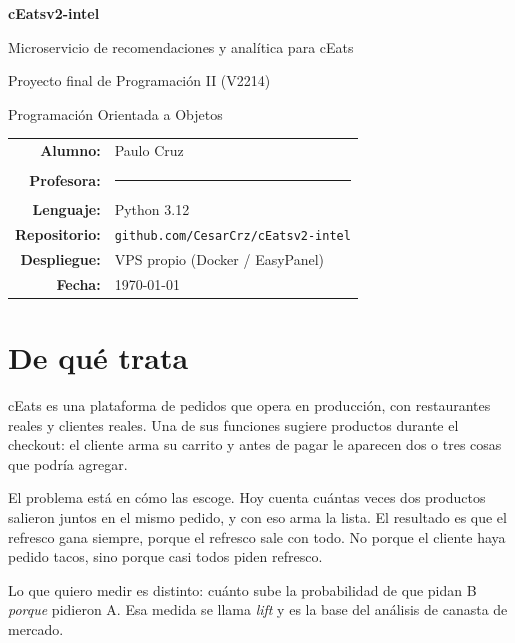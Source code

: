\documentclass[11pt,letterpaper]{article}
\begin{document}
\begin{titlepage}
\centering
\vspace*{2cm}
{\Huge\bfseries cEatsv2-intel\par}
\vspace{0.6cm}
{\Large Microservicio de recomendaciones y analítica para cEats\par}
\vspace{1.5cm}
{\large Proyecto final de Programación II (V2214)\par}
{\large Programación Orientada a Objetos\par}
\vspace{1.5cm}
\begin{tabular}{rl}
\textbf{Alumno:} & Paulo Cruz \\
\textbf{Profesora:} & \rule{5cm}{0.4pt} \\
\textbf{Lenguaje:} & Python 3.12 \\
\textbf{Repositorio:} & \texttt{github.com/CesarCrz/cEatsv2-intel} \\
\textbf{Despliegue:} & VPS propio (Docker / EasyPanel) \\
\textbf{Fecha:} & \today \\
\end{tabular}
\vfill
\end{titlepage}

\tableofcontents
\newpage

\section{De qué trata}

cEats es una plataforma de pedidos que opera en producción, con restaurantes
reales y clientes reales. Una de sus funciones sugiere productos durante el
checkout: el cliente arma su carrito y antes de pagar le aparecen dos o tres
cosas que podría agregar.

El problema está en cómo las escoge. Hoy cuenta cuántas veces dos productos
salieron juntos en el mismo pedido, y con eso arma la lista. El resultado es que
el refresco gana siempre, porque el refresco sale con todo. No porque el cliente
haya pedido tacos, sino porque casi todos piden refresco.

Lo que quiero medir es distinto: cuánto sube la probabilidad de que pidan B
\emph{porque} pidieron A. Esa medida se llama \emph{lift} y es la base del
análisis de canasta de mercado.
\end{document}
